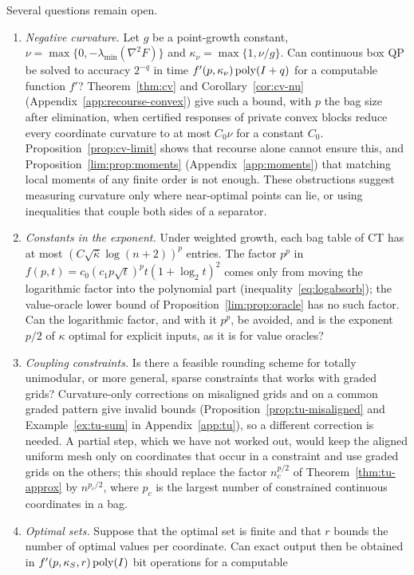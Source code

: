 Several questions remain open.
\begin{enumerate}[label=(\arabic*)]
\item \emph{Negative curvature.} Let $g$ be a point-growth constant,
$\nu=\max\{0,-\lambda_{\min}(\nabla^2F)\}$ and $\kappa_\nu=\max\{1,\nu/g\}$.
Can continuous box QP be solved to accuracy $2^{-q}$ in time
$f'(p,\kappa_\nu)\operatorname{poly}(I+q)$ for a computable function $f'$?
Theorem~\ref{thm:cv} and Corollary~\ref{cor:cv-nu}
(Appendix~\ref{app:recourse-convex}) give such a bound, with $p$ the bag size
after elimination, when certified responses of private convex blocks reduce
every coordinate curvature to at most $C_0\nu$ for a constant $C_0$.
Proposition~\ref{prop:cv-limit} shows that recourse alone cannot ensure this,
and Proposition~\ref{lim:prop:moments} (Appendix~\ref{app:moments}) that
matching local moments of any finite order is not enough. These obstructions
suggest measuring curvature only where near-optimal points can lie, or using
inequalities that couple both sides of a separator.
\item \emph{Constants in the exponent.} Under weighted growth, each bag
table of CT has at most $(C\sqrt{\bar\kappa}\log(n+2))^p$ entries. The factor
$p^p$ in $f(p,t)=c_0(c_1p\sqrt t)^pt(1+\log_2t)^2$ comes only from moving the
logarithmic factor into the polynomial part (inequality~\eqref{eq:logabsorb});
the value-oracle lower bound of Proposition~\ref{lim:prop:oracle} has no such
factor. Can the logarithmic factor, and with it $p^p$, be avoided, and is the
exponent $p/2$ of $\kappa$ optimal for explicit inputs, as it is for value
oracles?
\item \emph{Coupling constraints.} Is there a feasible rounding scheme for
totally unimodular, or more general, sparse constraints that works with
graded grids? Curvature-only corrections on misaligned grids and on a common
graded pattern give invalid bounds (Proposition~\ref{prop:tu-misaligned} and
Example~\ref{ex:tu-sum} in Appendix~\ref{app:tu}), so a different correction
is needed. A partial step, which we have not worked out, would keep the
aligned uniform mesh only on coordinates that occur in a constraint and use
graded grids on the others; this should replace the factor $n_c^{p/2}$ of
Theorem~\ref{thm:tu-approx} by $n^{p_c/2}$, where $p_c$ is the largest number
of constrained continuous coordinates in a bag.
\item \emph{Optimal sets.} Suppose that the optimal set is finite and that
$r$ bounds the number of optimal values per coordinate. Can exact output then
be obtained in $f'(p,\kappa_S,r)\operatorname{poly}(I)$ bit operations for a computable

\end{enumerate}

